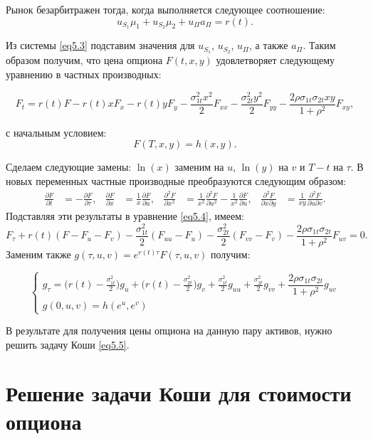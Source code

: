 \documentclass[a4paper, 12pt]{extreport}
\numberwithin{equation}{section}
\begin{document}
	Рынок безарбитражен тогда, когда выполняется следующее соотношение:
	$$u_{S_1}\mu_1+u_{S_2}\mu_2+u_{\Pi}a_{\Pi}=r(t).$$
	
	
	Из системы \eqref{eq5.3} подставим значения для $u_{S_1}$, $u_{S_2}$, $u_{\Pi}$, а также $a_{\Pi}$. Таким образом получим, что цена опциона $F(t,x,y)$ удовлетворяет следующему уравнению в частных производных:
	
	
	\begin{equation}\label{eq5.4}
		F_t=r(t)F-r(t)xF_x-r(t)yF_y-\frac{\sigma_{1t}^2x^2}{2}F_{xx}-\frac{\sigma_{2t}^2y^2}{2}F_{yy}-\dfrac{2\rho\sigma_{1t}\sigma_{2t}xy}{1+\rho^2}F_{xy} ,
	\end{equation}
	
	с начальным условием:
	$$F(T,x,y)=h(x,y).$$
	
	Сделаем следующие замены: $\ln(x)$ заменим на $u$, $\ln(y)$ на $v$ и $T-t$ на $\tau$. В новых переменных частные производные преобразуются следующим образом:	
	\begin{align*}
		\frac{\partial F}{\partial t}&=-\frac{\partial F}{\partial \tau},		&				 \frac{\partial F}{\partial x}&=\frac{1}{x}\frac{\partial F}{\partial u},		&				 \frac{\partial^2 F}{\partial x^2}&=\frac{1}{x^2}\frac{\partial^2 F}{\partial u^2}-\frac{1}{x^2}\frac{\partial F}{\partial u},		&				 \frac{\partial^2 F}{\partial x \partial y}&=\frac{1}{xy}\frac{\partial^2 F}{\partial u \partial v} .
	\end{align*}
	Подставляя эти результаты в уравнение \eqref{eq5.4}, имеем:
	$$F_\tau+r(t)(F-F_u-F_v)-\frac{\sigma_{1t}^2}{2}(F_{uu}-F_u)-\frac{\sigma_{2t}^2}{2}(F_{vv}-F_v)-\dfrac{2\rho\sigma_{1t}\sigma_{2t}}{1+\rho^2}F_{uv}=0 .$$	
	Заменим также $g(\tau,u,v)=e^{r(t)\tau}F(\tau,u,v)$ получим:
	
	\begin{equation}\label{eq5.5}
		\begin{cases}
			g_\tau=\bigl(r(t)-\frac{\sigma_{1t}^2}{2}\bigr)g_u+\bigl(r(t)-\frac{\sigma_{2t}^2}{2}\bigr)g_v+\frac{\sigma_{1t}^2}{2}g_{uu}+\frac{\sigma_{2t}^2}{2}g_{vv}+\dfrac{2\rho\sigma_{1t}\sigma_{2t}}{1+\rho^2}g_{uv}
			\\
			g(0,u,v)=h(e^u,e^v)
		\end{cases}
	\end{equation} 
	
	
	В результате для получения цены опциона на данную пару активов, нужно решить задачу Коши \eqref{eq5.5}.
	
	
	\section{Решение задачи Коши для стоимости опциона}
	
\end{document}
